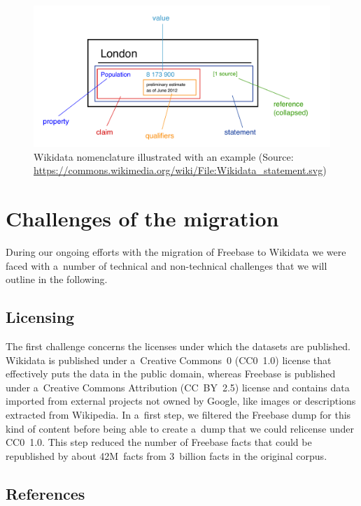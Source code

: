 \documentclass{sig-alternate}
\begin{document}
\begin{figure}[!htbp]
\centering
\includegraphics[width=8.45 cm]{img/Wikidata_statement.pdf}
\caption{Wikidata nomenclature illustrated with an example (Source:
	\url{https://commons.wikimedia.org/wiki/File:Wikidata_statement.svg})}
\label{fig:statement}
\end{figure}

\section{Challenges of the migration}\label{sec:challenges-of-the-migration}

During our ongoing efforts with the migration of Freebase to Wikidata
we were faced with a~number of technical and non-technical challenges
that we will outline in the following.

\subsection{Licensing}
\label{sec:licensing}

The first challenge concerns the licenses under which the datasets are published.
Wikidata is published under a~Creative Commons~0 (CC0~1.0) license
that effectively puts the data in the public domain,
whereas Freebase is published under a~Creative Commons Attribution (CC~BY~2.5) license
and contains data imported from external projects not owned by Google,
like images or descriptions extracted from Wikipedia.
In a~first step, we filtered the Freebase dump for this kind of content
before being able to create a~dump that we could relicense under CC0~1.0.
This step reduced the number of Freebase facts that could be republished by about 42M~facts
from 3~billion facts in the original corpus.

\subsection{References}
\end{document}
